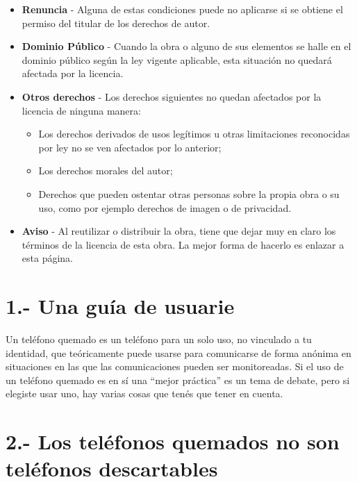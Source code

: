 \documentclass[
]{book}
\begin{document}
\begin{itemize}
\item
  \textbf{Renuncia} - Alguna de estas condiciones puede no aplicarse si se obtiene
  el permiso del titular de los derechos de autor.
\item
  \textbf{Dominio Público} - Cuando la obra o alguno de sus elementos se halle en
  el dominio público según la ley vigente aplicable, esta situación no quedará
  afectada por la licencia.
\item
  \textbf{Otros derechos} - Los derechos siguientes no quedan afectados por
  la licencia de ninguna manera:

  \begin{itemize}
  \item
    Los derechos derivados de usos legítimos u otras limitaciones
    reconocidas por ley no se ven afectados por lo anterior;
  \item
    Los derechos morales del autor;
  \item
    Derechos que pueden ostentar otras personas sobre la propia obra o
    su uso, como por ejemplo derechos de imagen o de privacidad.
  \end{itemize}
\item
  \textbf{Aviso} - Al reutilizar o distribuir la obra, tiene que dejar muy en claro
  los términos de la licencia de esta obra. La mejor forma de hacerlo es
  enlazar a esta página.
\end{itemize}

\hypertarget{una-guuxeda-de-usuarie}{%
\chapter*{1.- Una guía de usuarie}\label{una-guuxeda-de-usuarie}}

Un teléfono quemado es un teléfono para un solo uso, no vinculado a tu identidad, que teóricamente puede usarse para comunicarse de forma anónima en situaciones en las que las comunicaciones pueden ser monitoreadas. Si el uso de un teléfono quemado es en sí una ``mejor práctica'' es un tema de debate, pero si elegiste usar uno, hay varias cosas que tenés que tener en cuenta.

\hypertarget{los-teluxe9fonos-quemados-no-son-teluxe9fonos-descartables}{%
\chapter*{2.- Los teléfonos quemados no son teléfonos descartables}\label{los-teluxe9fonos-quemados-no-son-teluxe9fonos-descartables}}
\end{document}
